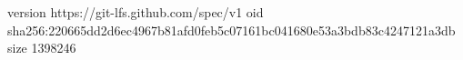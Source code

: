 version https://git-lfs.github.com/spec/v1
oid sha256:220665dd2d6ec4967b81afd0feb5c07161bc041680e53a3bdb83c4247121a3db
size 1398246

